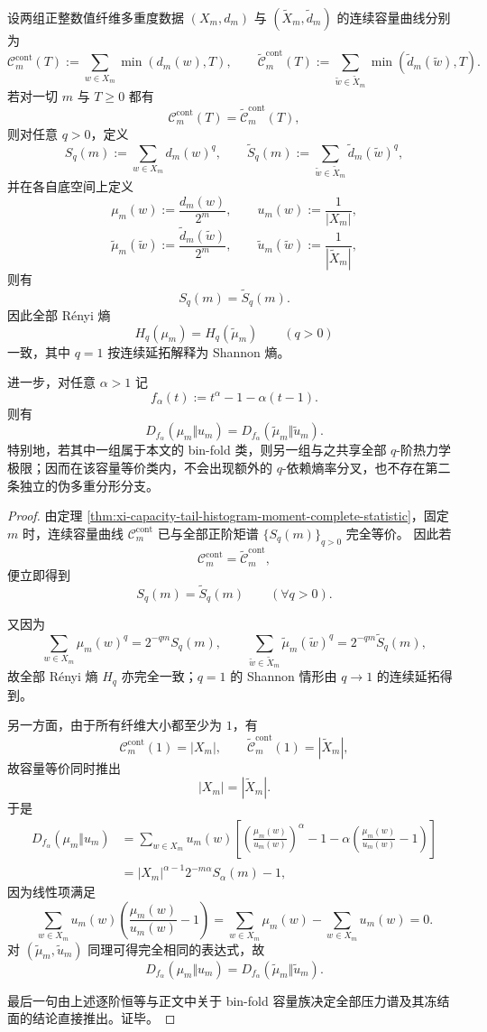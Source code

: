 \begin{theorem}[容量等价类的热力学刚性]\label{thm:conclusion-capacity-equivalence-thermodynamic-rigidity}
设两组正整数值纤维多重度数据 \((X_m,d_m)\) 与 \((\widetilde X_m,\widetilde d_m)\) 的连续容量曲线分别为
\[
\mathcal C_m^{\mathrm{cont}}(T):=\sum_{w\in X_m}\min(d_m(w),T),
\qquad
\widetilde{\mathcal C}_m^{\mathrm{cont}}(T):=\sum_{\widetilde w\in \widetilde X_m}\min(\widetilde d_m(\widetilde w),T).
\]
若对一切 \(m\) 与 \(T\ge 0\) 都有
\[
\mathcal C_m^{\mathrm{cont}}(T)=\widetilde{\mathcal C}_m^{\mathrm{cont}}(T),
\]
则对任意 \(q>0\)，定义
\[
S_q(m):=\sum_{w\in X_m}d_m(w)^q,
\qquad
\widetilde S_q(m):=\sum_{\widetilde w\in \widetilde X_m}\widetilde d_m(\widetilde w)^q,
\]
并在各自底空间上定义
\[
\mu_m(w):=\frac{d_m(w)}{2^m},
\qquad
u_m(w):=\frac{1}{|X_m|},
\]
\[
\widetilde\mu_m(\widetilde w):=\frac{\widetilde d_m(\widetilde w)}{2^m},
\qquad
\widetilde u_m(\widetilde w):=\frac{1}{|\widetilde X_m|},
\]
则有
\[
S_q(m)=\widetilde S_q(m).
\]
因此全部 Rényi 熵
\[
H_q(\mu_m)=H_q(\widetilde\mu_m)
\qquad(q>0)
\]
一致，其中 \(q=1\) 按连续延拓解释为 Shannon 熵。

进一步，对任意 \(\alpha>1\) 记
\[
f_\alpha(t):=t^\alpha-1-\alpha(t-1).
\]
则有
\[
D_{f_\alpha}(\mu_m\Vert u_m)
=
D_{f_\alpha}(\widetilde\mu_m\Vert \widetilde u_m).
\]
特别地，若其中一组属于本文的 bin-fold 类，则另一组与之共享全部 \(q\)-阶热力学极限；因而在该容量等价类内，不会出现额外的 \(q\)-依赖熵率分叉，也不存在第二条独立的伪多重分形分支。
\end{theorem}
\begin{proof}
由定理 \ref{thm:xi-capacity-tail-histogram-moment-complete-statistic}，固定 \(m\) 时，连续容量曲线 \(\mathcal C_m^{\mathrm{cont}}\) 已与全部正阶矩谱 \(\{S_q(m)\}_{q>0}\) 完全等价。
因此若
\[
\mathcal C_m^{\mathrm{cont}}=\widetilde{\mathcal C}_m^{\mathrm{cont}},
\]
便立即得到
\[
S_q(m)=\widetilde S_q(m)
\qquad(\forall q>0).
\]

又因为
\[
\sum_{w\in X_m}\mu_m(w)^q
=
2^{-qm}S_q(m),
\qquad
\sum_{\widetilde w\in \widetilde X_m}\widetilde\mu_m(\widetilde w)^q
=
2^{-qm}\widetilde S_q(m),
\]
故全部 Rényi 熵 \(H_q\) 亦完全一致；\(q=1\) 的 Shannon 情形由 \(q\to 1\) 的连续延拓得到。

另一方面，由于所有纤维大小都至少为 \(1\)，有
\[
\mathcal C_m^{\mathrm{cont}}(1)=|X_m|,
\qquad
\widetilde{\mathcal C}_m^{\mathrm{cont}}(1)=|\widetilde X_m|,
\]
故容量等价同时推出
\[
|X_m|=|\widetilde X_m|.
\]
于是
\[
\begin{aligned}
D_{f_\alpha}(\mu_m\Vert u_m)
&=
\sum_{w\in X_m}
u_m(w)\left[
\left(\frac{\mu_m(w)}{u_m(w)}\right)^\alpha
-1-\alpha\left(\frac{\mu_m(w)}{u_m(w)}-1\right)
\right]\\
&=
|X_m|^{\alpha-1}2^{-m\alpha}S_\alpha(m)-1,
\end{aligned}
\]
因为线性项满足
\[
\sum_{w\in X_m}u_m(w)\left(\frac{\mu_m(w)}{u_m(w)}-1\right)
=
\sum_{w\in X_m}\mu_m(w)-\sum_{w\in X_m}u_m(w)=0.
\]
对 \((\widetilde\mu_m,\widetilde u_m)\) 同理可得完全相同的表达式，故
\[
D_{f_\alpha}(\mu_m\Vert u_m)
=
D_{f_\alpha}(\widetilde\mu_m\Vert \widetilde u_m).
\]

最后一句由上述逐阶恒等与正文中关于 bin-fold 容量族决定全部压力谱及其冻结面的结论直接推出。证毕。
\end{proof}

